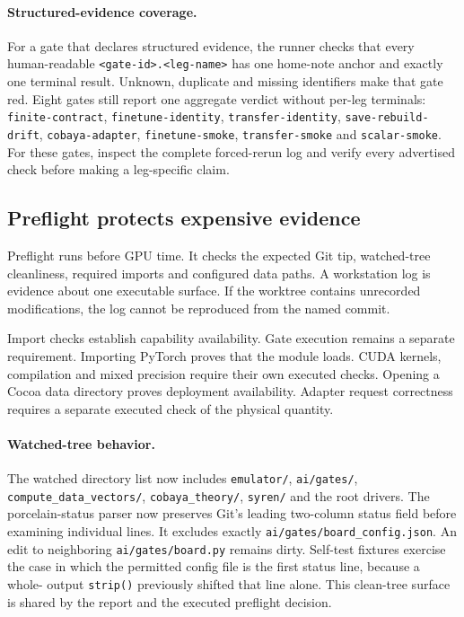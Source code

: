 \documentclass[10pt,aps,prd,twocolumn,nofootinbib]{revtex4-2}
\newcommand{\code}[1]{\texttt{#1}}
\begin{document}
\paragraph{Structured-evidence coverage.}
For a gate that declares structured evidence, the runner checks that every
human-readable \code{<gate-id>.<leg-name>} has one home-note anchor and exactly
one terminal result.  Unknown, duplicate and missing identifiers make that
gate red.  Eight gates still report one aggregate verdict without per-leg
terminals: \code{finite-contract}, \code{finetune-identity},
\code{transfer-identity}, \code{save-rebuild-drift},
\code{cobaya-adapter}, \code{finetune-smoke}, \code{transfer-smoke} and
\code{scalar-smoke}.  For these gates, inspect the complete forced-rerun log
and verify every advertised check before making a leg-specific claim.

\subsection{Preflight protects expensive evidence}

Preflight runs before GPU time.  It checks the expected Git tip, watched-tree
cleanliness, required imports and configured data paths.  A workstation log
is evidence about one executable surface.  If the worktree contains
unrecorded modifications, the log cannot be reproduced from the named commit.

Import checks establish capability availability.  Gate execution remains a
separate requirement.  Importing PyTorch proves that the module loads.  CUDA
kernels, compilation and mixed precision require their own executed checks.
Opening a Cocoa data directory proves deployment availability.  Adapter
request correctness requires a separate executed check of the physical
quantity.

\paragraph{Watched-tree behavior.}
The watched directory list now includes \code{emulator/}, \code{ai/gates/},
\code{compute\_data\_vectors/}, \code{cobaya\_theory/}, \code{syren/} and the
root drivers.  The porcelain-status parser now preserves Git's leading
two-column status field before examining individual lines.  It excludes
exactly \code{ai/gates/board\_config.json}.  An edit to neighboring
\code{ai/gates/board.py} remains dirty.  Self-test fixtures exercise the case in
which the permitted config file is the first status line, because a whole-
output \code{strip()} previously shifted that line alone.  This clean-tree
surface is shared by the report and the executed preflight decision.
\end{document}
